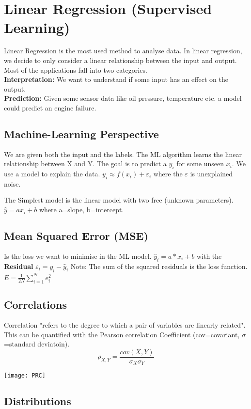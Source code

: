 \section{Linear Regression (Supervised Learning)}
Linear Regression is the most used method to analyse data. In linear regression, we  decide to only consider a linear relationship between the input and output. Most of the applications fall into two categories. \\
\textbf{Interpretation:} We want to understand if some input has an effect on the output. \\
\textbf{Prediction:} Given some sensor data like oil pressure, temperature etc. a model could predict an engine failure.

\subsection{Machine-Learning Perspective}
We are given both the input and the labels. The ML algorithm learns the linear relationship between X and Y. The goal is to predict a $y_{i}$ for some unseen $x_{i}$. We use a model to explain the data. $y_{i}\approx f(x_{i}) + \varepsilon_{i}$ where the $\varepsilon$ is unexplained noise.

The Simplest model is the linear model with two free (unknown parameters).
$\hat{y} = ax_{i} + b$ where a=slope, b=intercept.

\subsection{Mean Squared Error (MSE)}
Is the loss we want to minimise in the ML model. $\hat{y}_{i}=a * x_{i}+b$ with the \textbf{Residual} $\varepsilon_{i}=y_{¡}-\hat{y}_{i}$ Note: The sum of the squared residuals is the loss function. $E=\frac{1}{2N} \sum_{i=1}^N e_{i}^2$

\subsection{Correlations}
\begin{minipage}{0,5\linewidth}
	Correlation "refers to the degree to which a pair of variables are linearly related". This can be quantified with the Pearson correlation Coefficient (cov=covariant, $\sigma$=standard deviatoin).
	\[ \rho_{X,Y} = \frac{cov(X,Y)}{\sigma_{X} \sigma_{Y}}  \]  
\end{minipage}
\begin{minipage}{0,5\linewidth}
	\texttt{[image: PRC]}
\end{minipage}

\subsection{Distributions}
